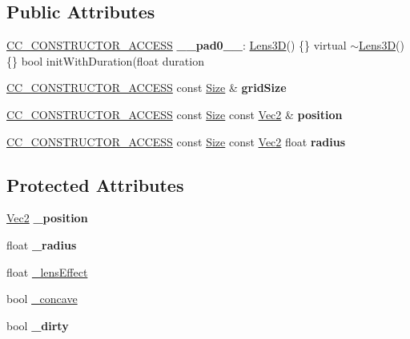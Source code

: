 \subsection*{Public Attributes}
\begin{DoxyCompactItemize}
\item 
\mbox{\label{classLens3D_aac7b9d016761f1cae5f0bc88e16f7a9a}} 
\hyperlink{_2cocos2d_2cocos_2base_2ccConfig_8h_a25ef1314f97c35a2ed3d029b0ead6da0}{C\+C\+\_\+\+C\+O\+N\+S\+T\+R\+U\+C\+T\+O\+R\+\_\+\+A\+C\+C\+E\+SS} {\bfseries \+\_\+\+\_\+pad0\+\_\+\+\_\+}\+: \hyperlink{classLens3D}{Lens3D}() \{\} virtual $\sim$\hyperlink{classLens3D}{Lens3D}() \{\} bool init\+With\+Duration(float duration
\item 
\mbox{\label{classLens3D_a20045da3f7b4ed9d9a9accce09155f6a}} 
\hyperlink{_2cocos2d_2cocos_2base_2ccConfig_8h_a25ef1314f97c35a2ed3d029b0ead6da0}{C\+C\+\_\+\+C\+O\+N\+S\+T\+R\+U\+C\+T\+O\+R\+\_\+\+A\+C\+C\+E\+SS} const \hyperlink{classSize}{Size} \& {\bfseries grid\+Size}
\item 
\mbox{\label{classLens3D_a6c497a1de2bea4091d25515d2fc9f8cf}} 
\hyperlink{_2cocos2d_2cocos_2base_2ccConfig_8h_a25ef1314f97c35a2ed3d029b0ead6da0}{C\+C\+\_\+\+C\+O\+N\+S\+T\+R\+U\+C\+T\+O\+R\+\_\+\+A\+C\+C\+E\+SS} const \hyperlink{classSize}{Size} const \hyperlink{classVec2}{Vec2} \& {\bfseries position}
\item 
\mbox{\label{classLens3D_af7d6d4f852d140b70a24675d491cb42b}} 
\hyperlink{_2cocos2d_2cocos_2base_2ccConfig_8h_a25ef1314f97c35a2ed3d029b0ead6da0}{C\+C\+\_\+\+C\+O\+N\+S\+T\+R\+U\+C\+T\+O\+R\+\_\+\+A\+C\+C\+E\+SS} const \hyperlink{classSize}{Size} const \hyperlink{classVec2}{Vec2} float {\bfseries radius}
\end{DoxyCompactItemize}
\subsection*{Protected Attributes}
\begin{DoxyCompactItemize}
\item 
\mbox{\label{classLens3D_a02f97165fc4c917cbc92514ccefa8761}} 
\hyperlink{classVec2}{Vec2} {\bfseries \+\_\+position}
\item 
\mbox{\label{classLens3D_ac78fd84fd3ce3519bd2170560da6bb54}} 
float {\bfseries \+\_\+radius}
\item 
float \hyperlink{classLens3D_af79217e24b57756ba0a7b2ab393888a6}{\+\_\+lens\+Effect}
\item 
bool \hyperlink{classLens3D_a76abf3128609e24193ecdbec60cac55a}{\+\_\+concave}
\item 
\mbox{\label{classLens3D_a7ab292dbbf56c8d007b016c2196ba101}} 
bool {\bfseries \+\_\+dirty}
\end{DoxyCompactItemize}
